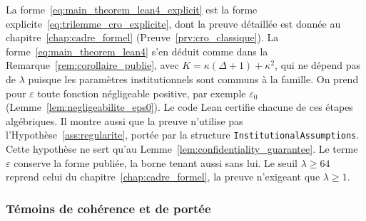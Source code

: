 \begin{sloppypar}
\begin{Preuve}
La forme~\eqref{eq:main_theorem_lean4_explicit} est la forme
explicite~\eqref{eq:trilemme_cro_explicite}, dont la preuve d\'etaill\'ee est donn\'ee au
chapitre~\ref{chap:cadre_formel} (Preuve~\ref{prv:cro_classique}). La
forme~\eqref{eq:main_theorem_lean4} s'en d\'eduit comme dans la
Remarque~\ref{rem:corollaire_publie}, avec $K = \kappa(\Delta+1)+\kappa^2$, qui ne
d\'epend pas de $\lambda$ puisque les param\`etres institutionnels sont communs \`a
la famille. On prend pour $\varepsilon$ toute fonction n\'egligeable positive, par
exemple $\varepsilon_0$ (Lemme~\ref{lem:negligeabilite_eps0}). Le code Lean
certifie chacune de ces \'etapes alg\'ebriques. Il montre aussi que la preuve
n'utilise pas l'Hypoth\`ese~\ref{ass:regularite}, port\'ee par la structure
\texttt{InstitutionalAssumptions}. Cette hypoth\`ese ne sert qu'au
Lemme~\ref{lem:confidentiality_guarantee}. Le terme $\varepsilon$ conserve la forme
publi\'ee, la borne tenant aussi sans lui. Le seuil $\lambda \geq 64$ reprend celui
du chapitre~\ref{chap:cadre_formel}, la preuve n'exigeant que $\lambda \geq 1$.
\end{Preuve}
\end{sloppypar}

\subsubsection{T\'emoins de coh\'erence et de port\'ee}
\label{subsubsec:temoins_lean4}

